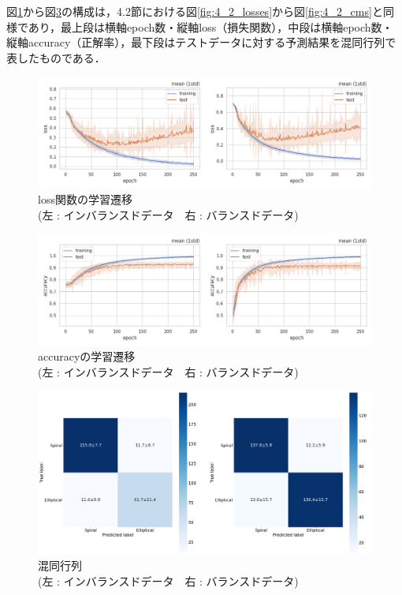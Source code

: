 \documentclass[a4j, 11pt]{jreport}
\begin{document}
図\ref{fig:4_3_losses}から図\ref{fig:4_3_cms}の構成は，4.2節における図\ref{fig:4_2_losses}から図\ref{fig:4_2_cms}と同様であり，最上段は横軸epoch数・縦軸loss（損失関数），中段は横軸epoch数・縦軸accuracy（正解率），最下段はテストデータに対する予測結果を混同行列で表したものである．


\begin{figure}[H]
  \centering
  \includegraphics[width=1\hsize, keepaspectratio]{images/drawio/4_3_losses.png}
  \caption{loss関数の学習遷移\\(左 : インバランスドデータ　右 : バランスドデータ)}
  \label{fig:4_3_losses}
\end{figure}
 
\begin{figure}[H]
  \centering
  \includegraphics[width=1\hsize, keepaspectratio]{images/drawio/4_3_accs.png}
  \caption{accuracyの学習遷移\\(左 : インバランスドデータ　右 : バランスドデータ)}
  \label{fig:4_3_accs}
\end{figure}
 
\begin{figure}[H]
  \centering
  \includegraphics[width=1\hsize, keepaspectratio]{images/drawio/4_3_cms.png}
  \caption{混同行列\\(左 : インバランスドデータ　右 : バランスドデータ)}
  \label{fig:4_3_cms}
\end{figure}
\end{document}
